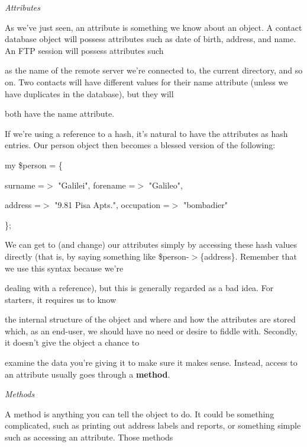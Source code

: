 \documentclass[a4paper,11pt]{book}
\begin{document}
\noindent 

\noindent 

\noindent \textit{Attributes}

\noindent As we've just seen, an attribute is something we know about an object. A contact database object will possess attributes such as date of birth, address, and name. An FTP session will possess attributes such

\noindent as the name of the remote server we're connected to, the current directory, and so on. Two contacts will have different values for their name attribute (unless we have duplicates in the database), but they will

\noindent both have the name attribute.

\noindent 

\noindent If we're using a reference to a hash, it's natural to have the attributes as hash entries. Our person object then becomes a blessed version of the following:

\noindent 

\noindent my \$person = \{

\noindent surname =$>$ "Galilei", forename =$>$ "Galileo",

\noindent address =$>$ "9.81 Pisa Apts.", occupation =$>$ "bombadier"

\noindent \};

\noindent 

\noindent We can get to (and change) our attributes simply by accessing these hash values directly (that is, by saying something like \$person-$>$\{address\}. Remember that we use this syntax because we're

\noindent dealing with a reference), but this is generally regarded as a bad idea. For starters, it requires us to know

\noindent the internal structure of the object and where and how the attributes are stored which, as an end-user, we should have no need or desire to fiddle with. Secondly, it doesn't give the object a chance to

\noindent examine the data you're giving it to make sure it makes sense. Instead, access to an attribute usually goes through a \textbf{method}.

\noindent 

\noindent \textit{Methods}

\noindent A method is anything you can tell the object to do. It could be something complicated, such as printing out address labels and reports, or something simple such as accessing an attribute. Those methods
\end{document}
